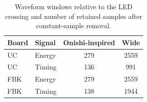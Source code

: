 \begin{table}[tbp]
\centering
\caption{Waveform windows relative to the LED crossing and number of retained samples after constant-sample removal.}
\label{tab:input-windows}
\begin{tabular}{llcc}
\toprule
Board & Signal & Onishi-inspired & Wide \\
\midrule
UC  & Energy & 279 & 2559 \\
UC  & Timing & 136 & 991 \\
FBK & Energy & 279 & 2559 \\
FBK & Timing & 138 & 1944 \\
\bottomrule
\end{tabular}
\end{table}
